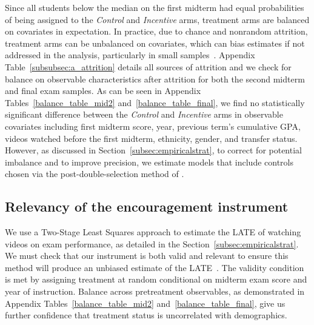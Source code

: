 \documentclass[12pt]{article}
\begin{document}
Since all students below the median on the first midterm had equal probabilities of being assigned to the \textit{Control} and \textit{Incentive} arms, treatment arms are balanced on covariates in expectation.
In practice, due to chance and nonrandom attrition, treatment arms can be unbalanced on covariates, which can bias estimates if not addressed in the analysis, particularly in small samples~\parencite{ai2017}.
Appendix Table~\ref{subsubsec:a_attrition} details all sources of attrition and we check for balance on observable characteristics after attrition for both the second midterm and final exam samples.
As can be seen in Appendix Tables~\ref{balance_table_mid2} and~\ref{balance_table_final}, we find no statistically significant difference between the \textit{Control} and \textit{Incentive} arms in observable covariates including first midterm score, year, previous term's cumulative GPA, videos watched before the first midterm, ethnicity, gender, and transfer status.
However, as discussed in Section~\ref{subsec:empiricalstrat}, to correct for potential imbalance and to improve precision, we estimate models that include controls chosen via the post-double-selection method of \textcite{bch2014a}.

\subsection{Relevancy of the encouragement instrument}\label{subsec:relevancy}

We use a Two-Stage Least Squares approach to estimate the LATE of watching videos on exam performance, as detailed in the Section~\ref{subsec:empiricalstrat}.
We must check that our instrument is both valid and relevant to ensure this method will produce an unbiased estimate of the LATE~\parencite{ir2015}.
The validity condition is met by assigning treatment at random conditional on midterm exam score and year of instruction.
Balance across pretreatment observables, as demonstrated in Appendix Tables~\ref{balance_table_mid2} and~\ref{balance_table_final}, give us further confidence that treatment status is uncorrelated with demographics.
\end{document}
